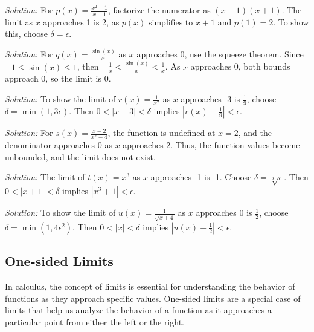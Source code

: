 \documentclass[a4paper,12pt]{book}
\newenvironment{solution}[1][]
{\par\noindent\textit{Solution:} \rmfamily}{\medskip}
\begin{document}
\begin{solution}[5]
For \( p(x) = \frac{x^2 - 1}{x - 1} \), factorize the numerator as \( (x - 1)(x + 1) \). The limit as \( x \) approaches 1 is 2, as \( p(x) \) simplifies to \( x + 1 \) and \( p(1) = 2 \). To show this, choose \(\delta = \epsilon\).
\end{solution}

\begin{solution}[6]
For \( q(x) = \frac{\sin(x)}{x} \) as \( x \) approaches 0, use the squeeze theorem. Since \( -1 \leq \sin(x) \leq 1 \), then \( -\frac{1}{x} \leq \frac{\sin(x)}{x} \leq \frac{1}{x} \). As \( x \) approaches 0, both bounds approach 0, so the limit is 0.
\end{solution}

\begin{solution}[7]
To show the limit of \( r(x) = \frac{1}{x^2} \) as \( x \) approaches -3 is \(\frac{1}{9}\), choose \(\delta = \min\left(1, 3\epsilon\right)\). Then \( 0 < |x + 3| < \delta \) implies \( |r(x) - \frac{1}{9}| < \epsilon \).
\end{solution}

\begin{solution}[8]
For \( s(x) = \frac{x - 2}{x^2 - 4} \), the function is undefined at \( x = 2 \), and the denominator approaches 0 as \( x \) approaches 2. Thus, the function values become unbounded, and the limit does not exist.
\end{solution}

\begin{solution}[9]
The limit of \( t(x) = x^3 \) as \( x \) approaches -1 is -1. Choose \(\delta = \sqrt[3]{\epsilon}\). Then \( 0 < |x + 1| < \delta \) implies \( |x^3 + 1| < \epsilon \).
\end{solution}

\begin{solution}[10]
To show the limit of \( u(x) = \frac{1}{\sqrt{x + 4}} \) as \( x \) approaches 0 is \(\frac{1}{2}\), choose \(\delta = \min\left(1, 4\epsilon^2\right)\). Then \( 0 < |x| < \delta \) implies \( |u(x) - \frac{1}{2}| < \epsilon \).
\end{solution}

\subsection{One-sided Limits}

In calculus, the concept of limits is essential for understanding the behavior of functions as they approach specific values. One-sided limits are a special case of limits that help us analyze the behavior of a function as it approaches a particular point from either the left or the right.
\end{document}

